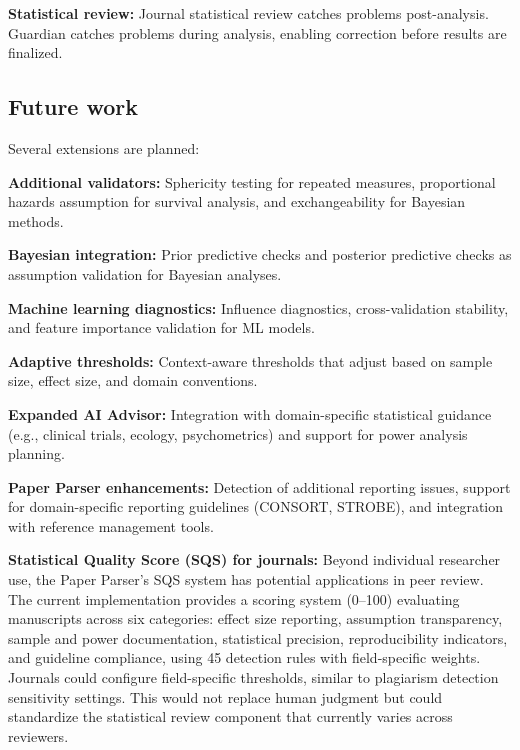 \documentclass[article]{jss}
\begin{document}
\textbf{Statistical review:} Journal statistical review catches problems post-analysis. Guardian catches problems during analysis, enabling correction before results are finalized.

\subsection{Future work}

Several extensions are planned:

\textbf{Additional validators:} Sphericity testing for repeated measures, proportional hazards assumption for survival analysis, and exchangeability for Bayesian methods.

\textbf{Bayesian integration:} Prior predictive checks and posterior predictive checks as assumption validation for Bayesian analyses.

\textbf{Machine learning diagnostics:} Influence diagnostics, cross-validation stability, and feature importance validation for ML models.

\textbf{Adaptive thresholds:} Context-aware thresholds that adjust based on sample size, effect size, and domain conventions.

\textbf{Expanded AI Advisor:} Integration with domain-specific statistical guidance (e.g., clinical trials, ecology, psychometrics) and support for power analysis planning.

\textbf{Paper Parser enhancements:} Detection of additional reporting issues, support for domain-specific reporting guidelines (CONSORT, STROBE), and integration with reference management tools.

\textbf{Statistical Quality Score (SQS) for journals:} Beyond individual researcher use, the Paper Parser's SQS system has potential applications in peer review. The current implementation provides a scoring system (0--100) evaluating manuscripts across six categories: effect size reporting, assumption transparency, sample and power documentation, statistical precision, reproducibility indicators, and guideline compliance, using 45 detection rules with field-specific weights. Journals could configure field-specific thresholds, similar to plagiarism detection sensitivity settings. This would not replace human judgment but could standardize the statistical review component that currently varies across reviewers.

\end{document}
